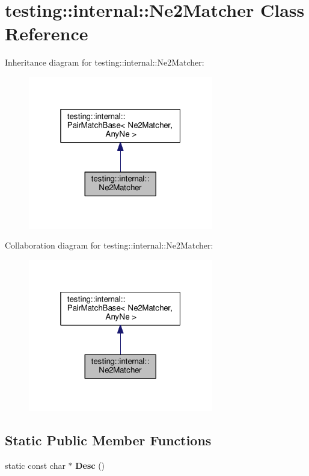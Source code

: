 \hypertarget{classtesting_1_1internal_1_1Ne2Matcher}{}\section{testing\+:\+:internal\+:\+:Ne2\+Matcher Class Reference}
\label{classtesting_1_1internal_1_1Ne2Matcher}


Inheritance diagram for testing\+:\+:internal\+:\+:Ne2\+Matcher\+:\nopagebreak
\begin{figure}[H]
\begin{center}
\leavevmode
\includegraphics[width=229pt]{classtesting_1_1internal_1_1Ne2Matcher__inherit__graph}
\end{center}
\end{figure}


Collaboration diagram for testing\+:\+:internal\+:\+:Ne2\+Matcher\+:\nopagebreak
\begin{figure}[H]
\begin{center}
\leavevmode
\includegraphics[width=229pt]{classtesting_1_1internal_1_1Ne2Matcher__coll__graph}
\end{center}
\end{figure}
\subsection*{Static Public Member Functions}
\begin{DoxyCompactItemize}
\item 
static const char $\ast$ {\bfseries Desc} ()\hypertarget{classtesting_1_1internal_1_1Ne2Matcher_a4a387f6ef1d20caf53911ef91c0f39f1}{}\label{classtesting_1_1internal_1_1Ne2Matcher_a4a387f6ef1d20caf53911ef91c0f39f1}

\end{DoxyCompactItemize}
